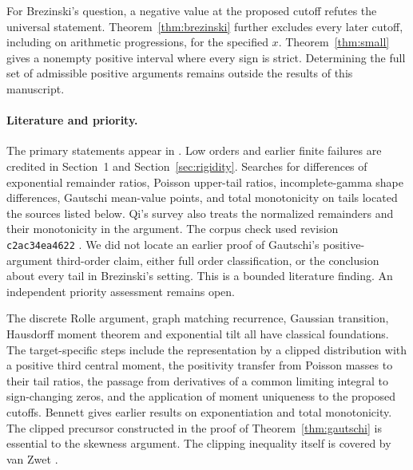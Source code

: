\documentclass[11pt,a4paper]{article}
\begin{document}
For Brezinski's question, a negative value at the proposed cutoff refutes the universal statement. Theorem~\ref{thm:brezinski} further excludes every later cutoff, including on arithmetic progressions, for the specified $x$. Theorem~\ref{thm:small} gives a nonempty positive interval where every sign is strict. Determining the full set of admissible positive arguments remains outside the results of this manuscript.

\paragraph{Literature and priority.}
The primary statements appear in \cite{gautschi,sitnik,brezinski}. Low orders and earlier finite failures are credited in Section~1 and Section~\ref{sec:rigidity}. Searches for differences of exponential remainder ratios, Poisson upper-tail ratios, incomplete-gamma shape differences, Gautschi mean-value points, and total monotonicity on tails located the sources listed below. Qi's survey \cite{qi} also treats the normalized remainders and their monotonicity in the argument. The corpus check used revision \texttt{c2ac34ea4622} \cite{vmrc}. We did not locate an earlier proof of Gautschi's positive-argument third-order claim, either full order classification, or the conclusion about every tail in Brezinski's setting. This is a bounded literature finding. An independent priority assessment remains open.

The discrete Rolle argument, graph matching recurrence, Gaussian transition, Hausdorff moment theorem and exponential tilt all have classical foundations. The target-specific steps include the representation by a clipped distribution with a positive third central moment, the positivity transfer from Poisson masses to their tail ratios, the passage from derivatives of a common limiting integral to sign-changing zeros, and the application of moment uniqueness to the proposed cutoffs. Bennett \cite{bennett} gives earlier results on exponentiation and total monotonicity. The clipped precursor constructed in the proof of Theorem~\ref{thm:gautschi} is essential to the skewness argument. The clipping inequality itself is covered by van Zwet \cite{vanzwet}.

\appendix
\end{document}
